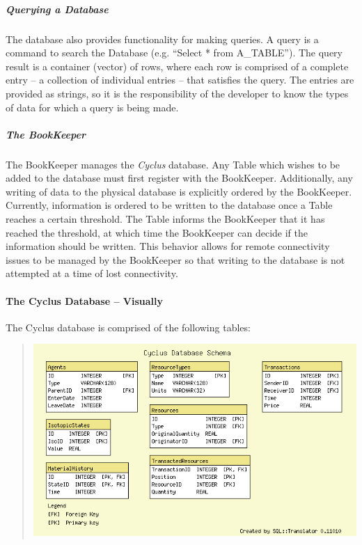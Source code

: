 \documentclass[letterpaper,10pt,english]{sphinxmanual}
\begin{document}
\subparagraph{Querying a Database}
\label{devdoc/output_dbase:querying-a-database}
The database also provides functionality for making queries. A query is a command to search the
Database (e.g. ``Select * from A\_TABLE''). The query result is a container (vector) of rows, where
each row is comprised of a complete entry -- a collection of individual entries -- that satisfies
the query. The entries are provided as strings, so it is the responsibility of the developer to
know the types of data for which a query is being made.


\subparagraph{The BookKeeper}
\label{devdoc/output_dbase:the-bookkeeper}
The BookKeeper manages the \emph{Cyclus} database. Any Table which wishes to be added to the database must
first register with the BookKeeper. Additionally, any writing of data to the physical database is
explicitly ordered by the BookKeeper. Currently, information is ordered to be written to the database
once a Table reaches a certain threshold. The Table informs the BookKeeper that it has reached the
threshold, at which time the BookKeeper can decide if the information should be written. This
behavior allows for remote connectivity issues to be managed by the BookKeeper so that writing to the
database is not attempted at a time of lost connectivity.


\paragraph{The Cyclus Database -- Visually}
\label{devdoc/output_dbase:the-cyclus-database-visually}
The Cyclus database is comprised of the following tables:
\begin{quote}

\includegraphics{cycl_schema_bare.png}
\end{quote}
\end{document}

